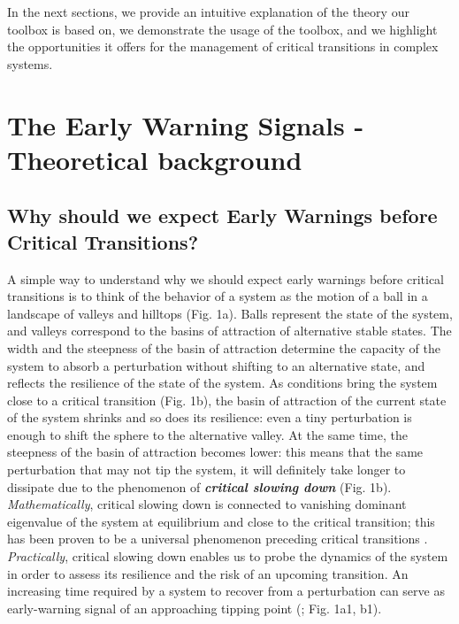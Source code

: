 \documentclass[12pt,a4paper,final]{article}
\begin{document}
\begin{doublespacing}
In the next sections, we provide an intuitive explanation of the theory our toolbox is based on, we demonstrate the usage of the toolbox, and we highlight the opportunities it offers for the management of critical transitions in complex systems.

\section{The Early Warning Signals - Theoretical background} 

\subsection{Why should we expect Early Warnings before Critical Transitions?}
A simple way to understand why we should expect early warnings before critical transitions is to think of the behavior of a system as the motion of a ball in a landscape of valleys and hilltops (Fig. 1a). Balls represent the state of the system, and valleys correspond to the basins of attraction of alternative stable states. The width and the steepness of the basin of attraction determine the capacity of the system to absorb a perturbation without shifting to an alternative state, and reflects the resilience of the state of the system. As conditions bring the system close to a critical transition (Fig. 1b), the basin of attraction of the current state of the system shrinks and so does its resilience: even a tiny perturbation is enough to shift the sphere to the alternative valley. At the same time, the steepness of the basin of attraction becomes lower: this means that the same perturbation that may not tip the system, it will definitely take longer to dissipate due to the phenomenon of \textit{\textbf{critical slowing down}} (Fig. 1b). \textit{Mathematically}, critical slowing down is connected to vanishing dominant eigenvalue of the system at equilibrium and close to the critical transition; this has been proven to be a universal phenomenon preceding critical transitions \cite{Wissel1984,Strogatz1994}. \textit{Practically}, critical slowing down enables us to probe the dynamics of the system in order to assess its resilience and the risk of an upcoming transition. An increasing time required by a system to recover from a perturbation can serve as early-warning signal of an approaching tipping point (\cite{VanNes2007}; Fig. 1a1, b1).


\end{doublespacing}
\end{document}
